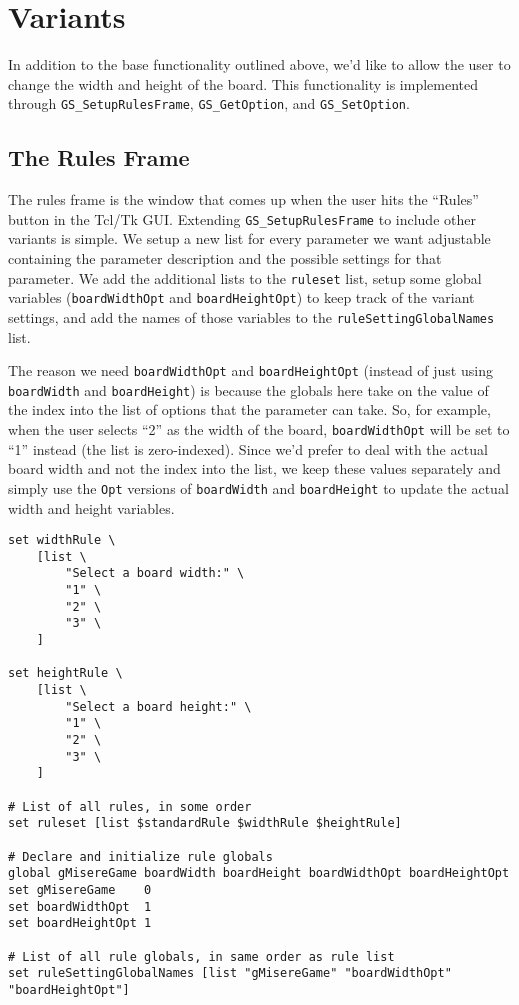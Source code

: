 \documentclass{article}
\begin{document}

\section{Variants}

In addition to the base functionality outlined above, we'd like to allow the user to change the width and height of the board. This functionality is implemented through \texttt{GS\_SetupRulesFrame}, \texttt{GS\_GetOption}, and \texttt{GS\_SetOption}.

\subsection{The Rules Frame}

The rules frame is the window that comes up when the user hits the ``Rules'' button in the Tcl/Tk GUI. Extending \texttt{GS\_SetupRulesFrame} to include other variants is simple. We setup a new list for every parameter we want adjustable containing the parameter description and the possible settings for that parameter. We add the additional lists to the \texttt{ruleset} list, setup some global variables (\texttt{boardWidthOpt} and \texttt{boardHeightOpt}) to keep track of the variant settings, and add the names of those variables to the \texttt{ruleSettingGlobalNames} list.

The reason we need \texttt{boardWidthOpt} and \texttt{boardHeightOpt} (instead of just using \texttt{boardWidth} and \texttt{boardHeight}) is because the globals here take on the value of the index into the list of options that the parameter can take. So, for example, when the user selects ``2'' as the width of the board, \texttt{boardWidthOpt} will be set to ``1'' instead (the list is zero-indexed). Since we'd prefer to deal with the actual board width and not the index into the list, we keep these values separately and simply use the \texttt{Opt} versions of \texttt{boardWidth} and \texttt{boardHeight} to update the actual width and height variables.

\begin{verbatim}
set widthRule \
    [list \
        "Select a board width:" \
        "1" \
        "2" \
        "3" \
    ]

set heightRule \
    [list \
        "Select a board height:" \
        "1" \
        "2" \
        "3" \
    ]

# List of all rules, in some order
set ruleset [list $standardRule $widthRule $heightRule]

# Declare and initialize rule globals
global gMisereGame boardWidth boardHeight boardWidthOpt boardHeightOpt
set gMisereGame    0
set boardWidthOpt  1
set boardHeightOpt 1

# List of all rule globals, in same order as rule list
set ruleSettingGlobalNames [list "gMisereGame" "boardWidthOpt" "boardHeightOpt"]
\end{verbatim}
\end{document}
